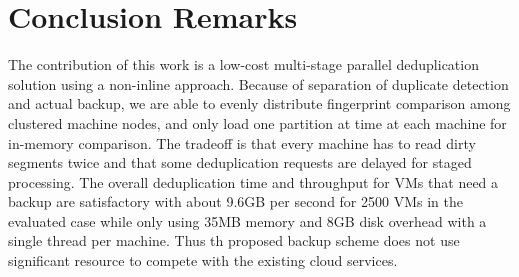 \section{Conclusion Remarks}
\label{sect:final}

The contribution  of this work is a low-cost multi-stage parallel deduplication solution
using a non-inline approach. Because of separation  of duplicate detection and actual backup,
we are able to evenly distribute  fingerprint comparison among clustered machine
nodes, and only load one partition at time at each machine for in-memory comparison.
The tradeoff is that every machine has to read dirty segments twice 
and that some deduplication requests are delayed for staged processing.  The overall 
deduplication time and throughput for VMs that need a backup are satisfactory 
with about 9.6GB per second for 2500 VMs in the evaluated case while only
using 35MB memory and  8GB disk overhead  with a single thread  per machine. Thus th proposed  backup
scheme does not use significant  resource to compete  with the existing cloud services.



